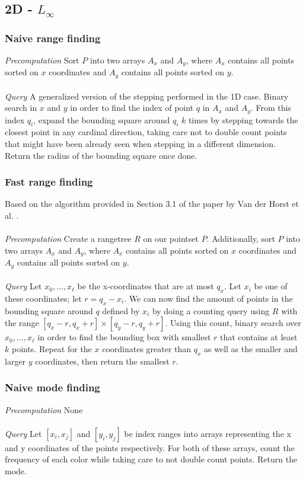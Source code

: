 \documentclass{article}
\begin{document}
\subsection{2D - $L_\infty$}
\subsubsection{Naive range finding}
\textit{Precomputation} Sort $P$ into two arrays $A_x$ and $A_y$, where $A_x$ contains all points sorted on $x$ coordinates and $A_y$ contains all points sorted on $y$. \\\\
\textit{Query} A generalized version of the stepping performed in the 1D case. Binary search in $x$ and $y$ in order to find the index of point $q$ in $A_x$ and $A_y$. From this index $q_i$, expand the bounding square around $q_i$ $k$ times by stepping towards the closest point in any cardinal direction, taking care not to double count points that might have been already seen when stepping in a different dimension. Return the radius of the bounding square once done.
\subsubsection{Fast range finding}
Based on the algorithm provided in Section 3.1 of the paper by Van der Horst et
al. \cite{vanderhorst_et_al:LIPIcs.ESA.2022.67}.\\\\ \textit{Precomputation}
Create a rangetree $R$ on our pointset $P$. Additionally, sort $P$ into two
arrays $A_x$ and $A_y$, where $A_x$ contains all points sorted on $x$
coordinates and $A_y$ contains all points sorted on $y$. \\\\ \textit{Query}
Let $x_0, ..., x_\ell$ be the x-coordinates that are at most $q_x$. Let $x_i$
be one of these coordinates; let $r = q_x - x_i$. We can now find the amount of
points in the bounding square around $q$ defined by $x_i$ by doing a counting
query using $R$ with the range $[q_x - r, q_x + r] \times [q_y - r, q_y + r]$.
Using this count, binary search over $x_0, ..., x_\ell$ in order to find the
bounding box with smallest $r$ that contains at least $k$ points. Repeat for
the $x$ coordinates greater than $q_x$ as well as the smaller and larger $y$
coordinates, then return the smallest $r$.
\subsubsection{Naive mode finding}
\textit{Precomputation} None \\\\
\textit{Query} Let $[x_i, x_j]$ and $[y_i, y_j]$ be index ranges into arrays representing the x and y coordinates of the points respectively. For both of these arrays, count the frequency of each color while taking care to not double count points. Return the mode.
\end{document}
